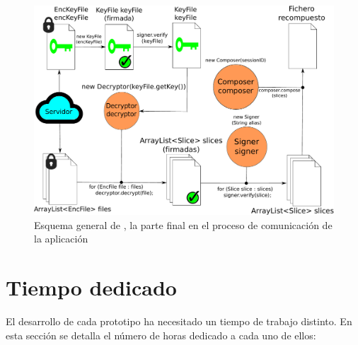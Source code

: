 \begin{figure}[!htb]
  \centering
  \includegraphics[scale=0.5]{Figures/abstractB}
  \decoRule
  \caption[]{Esquema general de , la parte final en el proceso de comunicación de la aplicación}
  \label{fig:abstractB}
\end{figure}


\section{Tiempo dedicado}

El desarrollo de cada prototipo ha necesitado un tiempo de trabajo distinto. En esta sección se detalla el número de horas dedicado a cada uno de ellos:

